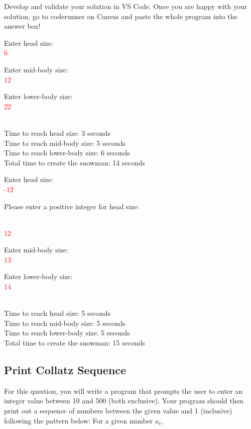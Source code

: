 Develop and validate your solution in VS Code. Once you are happy with your solution, go to coderunner on Canvas and paste the whole program into the answer box! 

\begin{sample}

Enter head size: \\\textcolor{red}{6}

Enter mid-body size: \\\textcolor{red}{12}

Enter lower-body size: \\\textcolor{red}{22}

\\Time to reach head size: 3 seconds
\\Time to reach mid-body size: 5 seconds
\\Time to reach lower-body size: 6 seconds
\\Total time to create the snowman: 14 seconds

\end{sample}

\begin{sample}

Enter head size: \\\textcolor{red}{-12}

Please enter a positive integer for head size:

\\\textcolor{red}{12}

Enter mid-body size: \\\textcolor{red}{13}

Enter lower-body size: \\\textcolor{red}{14}

\\Time to reach head size: 5 seconds
\\Time to reach mid-body size: 5 seconds
\\Time to reach lower-body size: 5 seconds
\\Total time to create the snowman: 15 seconds

\end{sample}



\subsection{Print Collatz Sequence}

For this question, you will write a program that prompts the user to enter an integer value between 10 and 500 (both exclusive). Your program should then print out a sequence of numbers between the given value and 1 (inclusive) following the pattern below:
For a given number $a_i$,

